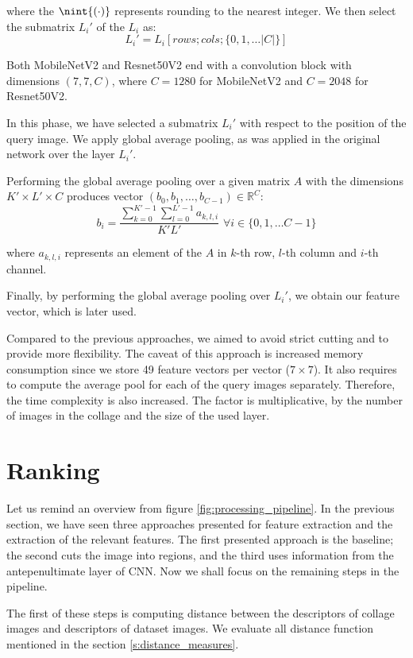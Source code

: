 where the $\nint{(\cdot)}$ represents rounding to the nearest integer. We then select the submatrix $L_i'$ of the $L_i$ as: 
$$
L_i' = L_i[rows; cols; \{0, 1, \ldots |C|\}]
$$

Both MobileNetV2 and Resnet50V2 end with a convolution block with dimensions $(7,7,C)$, where $C = 1280$ for MobileNetV2 and $C = 2048$ for Resnet50V2. 

In this phase, we have selected a submatrix $L_i'$ with respect to the position of the query image. We apply global average pooling, as was applied in the original network over the layer $L_i'$. 

Performing the global average pooling over a given matrix $A$ with the dimensions $K' \times L' \times C$ produces vector $(b_0, b_1, \ldots, b_{C-1}) \in \mathbb{R}^{C}$:
$$
    b_i = \frac{\sum_{k=0}^{K'-1} \sum_{l=0}^{L'-1} a_{k, l, i}} {K'L'} \,\, \forall i \in \{0, 1, \ldots C-1\}
$$

where $a_{k,l,i}$ represents an element of the $A$ in $k$-th row, $l$-th column and $i$-th channel.

Finally, by performing the global average pooling over $L_i'$, we obtain our feature vector, which is later used.

Compared to the previous approaches, we aimed to avoid strict cutting and to provide more flexibility. The caveat of this approach is increased memory consumption since we store 49 feature vectors per vector ($7\times7$). It also requires to compute the average pool for each of the query images separately. Therefore, the time complexity is also increased. The factor is multiplicative, by the number of images in the collage and the size of the used layer.

\section{Ranking}

Let us remind an overview from figure \ref{fig:processing_pipeline}. In the previous section, we have seen three approaches presented for feature extraction and the extraction of the relevant features. The first presented approach is the baseline; the second cuts the image into regions, and the third uses information from the antepenultimate layer of CNN. Now we shall focus on the remaining steps in the pipeline.

The first of these steps is computing distance between the descriptors of collage images and descriptors of dataset images. We  evaluate all distance function mentioned in the section \ref{s:distance_measures}.

